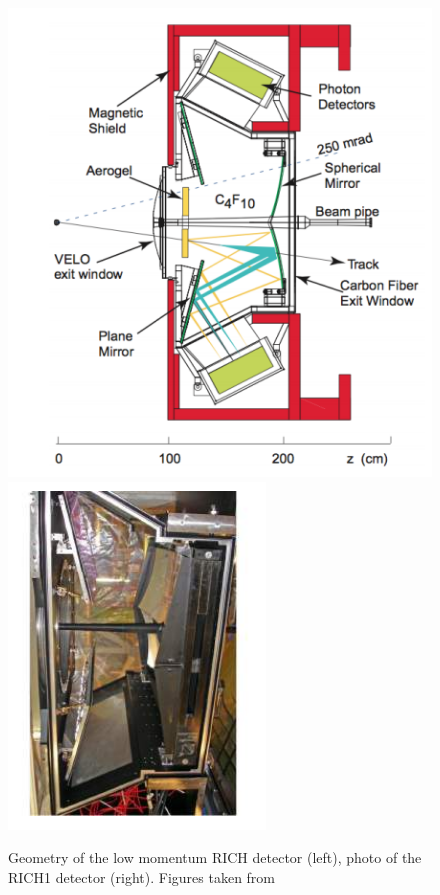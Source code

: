 \begin{figure}[h]
 \begin{center}
  \includegraphics[width=0.49\linewidth]{figures/RICH1.PNG}
   \includegraphics[width=0.49\linewidth]{figures/RICH1_photo.PNG}
    \caption{Geometry of the low momentum RICH detector (left), photo of the RICH1 detector (right). Figures taken from \cite{lhcb}}%
\label{fig:RICH1}%
 \end{center}
\end{figure}


